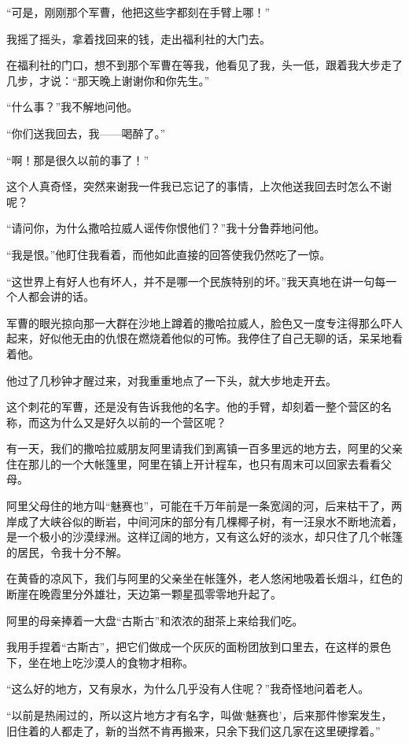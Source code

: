 \par “可是，刚刚那个军曹，他把这些字都刻在手臂上哪！”
\par 我摇了摇头，拿着找回来的钱，走出福利社的大门去。
\par 在福利社的门口，想不到那个军曹在等我，他看见了我，头一低，跟着我大步走了几步，才说：“那天晚上谢谢你和你先生。”
\par “什么事？”我不解地问他。
\par “你们送我回去，我——喝醉了。”
\par “啊！那是很久以前的事了！”
\par 这个人真奇怪，突然来谢我一件我已忘记了的事情，上次他送我回去时怎么不谢呢？
\par “请问你，为什么撒哈拉威人谣传你恨他们？”我十分鲁莽地问他。
\par “我是恨。”他盯住我看着，而他如此直接的回答使我仍然吃了一惊。
\par “这世界上有好人也有坏人，并不是哪一个民族特别的坏。”我天真地在讲一句每一个人都会讲的话。
\par 军曹的眼光掠向那一大群在沙地上蹲着的撒哈拉威人，脸色又一度专注得那么吓人起来，好似他无由的仇恨在燃烧着他似的可怖。我停住了自己无聊的话，呆呆地看着他。
\par 他过了几秒钟才醒过来，对我重重地点了一下头，就大步地走开去。
\par 这个刺花的军曹，还是没有告诉我他的名字。他的手臂，却刻着一整个营区的名称，而这为什么又是好久以前的一个营区呢？
\par 有一天，我们的撒哈拉威朋友阿里请我们到离镇一百多里远的地方去，阿里的父亲住在那儿的一个大帐篷里，阿里在镇上开计程车，也只有周末可以回家去看看父母。
\par 阿里父母住的地方叫“魅赛也”，可能在千万年前是一条宽阔的河，后来枯干了，两岸成了大峡谷似的断岩，中间河床的部分有几棵椰子树，有一汪泉水不断地流着，是一个极小的沙漠绿洲。这样辽阔的地方，又有这么好的淡水，却只住了几个帐篷的居民，令我十分不解。
\par 在黄昏的凉风下，我们与阿里的父亲坐在帐篷外，老人悠闲地吸着长烟斗，红色的断崖在晚霞里分外雄壮，天边第一颗星孤零零地升起了。
\par 阿里的母亲捧着一大盘“古斯古”和浓浓的甜茶上来给我们吃。
\par 我用手捏着“古斯古”，把它们做成一个灰灰的面粉团放到口里去，在这样的景色下，坐在地上吃沙漠人的食物才相称。
\par “这么好的地方，又有泉水，为什么几乎没有人住呢？”我奇怪地问着老人。
\par “以前是热闹过的，所以这片地方才有名字，叫做‘魅赛也’，后来那件惨案发生，旧住着的人都走了，新的当然不肯再搬来，只余下我们这几家在这里硬撑着。”
